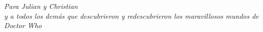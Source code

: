 \clearpage
\chapter*{}
\begin{flushright}
	\textit{
		Para Julian y Christian \\
		y a todos los demás que descubrieron y redescubrieron los maravillosos
		mundos de	Doctor Who
	}
\end{flushright}
